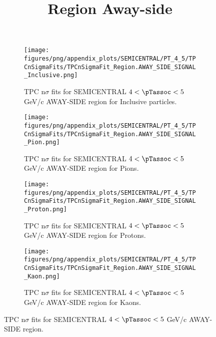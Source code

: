             \begin{figure}[H]
                \title{Region Away-side}
                \begin{subfigure}[b]{0.5\textwidth}
                    \centering
                    \texttt{[image: figures/png/appendix\_plots/SEMICENTRAL/PT\_4\_5/TPCnSigmaFits/TPCnSigmaFit\_Region.AWAY\_SIDE\_SIGNAL\_Inclusive.png]}
                    \caption{TPC n$\sigma$ fits for SEMICENTRAL $4 < \pTassoc < 5$ GeV/c AWAY-SIDE region for Inclusive particles.}
                    \label{fig:appendix_SEMICENTRAL_$4 < \pTassoc < 5$ GeV/c_AWAY_SIDE_SIGNAL_Inclusive}
                \end{subfigure}
                \begin{subfigure}[b]{0.5\textwidth}
                    \centering
                    \texttt{[image: figures/png/appendix\_plots/SEMICENTRAL/PT\_4\_5/TPCnSigmaFits/TPCnSigmaFit\_Region.AWAY\_SIDE\_SIGNAL\_Pion.png]}
                    \caption{TPC n$\sigma$ fits for SEMICENTRAL $4 < \pTassoc < 5$ GeV/c AWAY-SIDE region for Pions.}
                    \label{fig:appendix_SEMICENTRAL_$4 < \pTassoc < 5$ GeV/c_AWAY_SIDE_SIGNAL_Pion}
                \end{subfigure}
                \begin{subfigure}[b]{0.5\textwidth}
                    \centering
                    \texttt{[image: figures/png/appendix\_plots/SEMICENTRAL/PT\_4\_5/TPCnSigmaFits/TPCnSigmaFit\_Region.AWAY\_SIDE\_SIGNAL\_Proton.png]}
                    \caption{TPC n$\sigma$ fits for SEMICENTRAL $4 < \pTassoc < 5$ GeV/c AWAY-SIDE region for Protons.}
                    \label{fig:appendix_SEMICENTRAL_$4 < \pTassoc < 5$ GeV/c_AWAY_SIDE_SIGNAL_Proton}
                \end{subfigure}
                \begin{subfigure}[b]{0.5\textwidth}
                    \centering
                    \texttt{[image: figures/png/appendix\_plots/SEMICENTRAL/PT\_4\_5/TPCnSigmaFits/TPCnSigmaFit\_Region.AWAY\_SIDE\_SIGNAL\_Kaon.png]}
                    \caption{TPC n$\sigma$ fits for SEMICENTRAL $4 < \pTassoc < 5$ GeV/c AWAY-SIDE region for Kaons.}
                    \label{fig:appendix_SEMICENTRAL_$4 < \pTassoc < 5$ GeV/c_AWAY_SIDE_SIGNAL_Kaon}
                \end{subfigure}
                \caption{TPC n$\sigma$ fits for SEMICENTRAL $4 < \pTassoc < 5$ GeV/c AWAY-SIDE region.}
                \label{fig:appendix_SEMICENTRAL_$4 < \pTassoc < 5$ GeV/c_AWAY_SIDE_SIGNAL}
            \end{figure}
